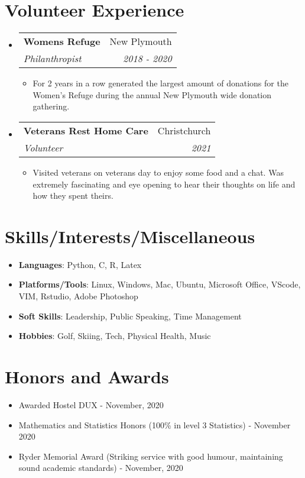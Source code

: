 \documentclass[a4paper,20pt]{article}
\makeatletter
\newcommand{\resumeItem}[2]{
  \item\small{
    \textbf{#1}{: #2 \vspace{-2pt}}
  }
}
\newcommand{\resumeSubheading}[4]{
  \vspace{-1pt}\item
    \begin{tabular*}{0.97\textwidth}{l@{\extracolsep{\fill}}r}
      \textbf{#1} & #2 \\
      \textit{#3} & \textit{#4} \\
    \end{tabular*}\vspace{-5pt}
}
\newcommand{\resumeSubItem}[2]{\resumeItem{#1}{#2}\vspace{-3pt}}
\newcommand{\resumeSubHeadingListStart}{\begin{itemize}[leftmargin=*]}
\newcommand{\resumeSubHeadingListEnd}{\end{itemize}}
\newcommand{\resumeItemListStart}{\begin{itemize}}
\newcommand{\resumeItemListEnd}{\end{itemize}\vspace{-5pt}}
\makeatother
\begin{document}
\section{Volunteer Experience}
  \resumeSubHeadingListStart
    \resumeSubheading{Womens Refuge}{New Plymouth}
    {Philanthropist}{2018 - 2020}
    \resumeItemListStart
        \item {For 2 years in a row generated the largest amount of donations for the Women's Refuge during the annual New Plymouth 
        wide donation gathering.}
      \resumeItemListEnd
\vspace{-1pt}
    \resumeSubheading
	{Veterans Rest Home Care}{Christchurch}
	{Volunteer}{2021}
		\resumeItemListStart
        \item {Visited veterans on veterans day to enjoy some food and a chat. Was extremely fascinating and eye opening to hear their 
        thoughts on life and how they spent theirs.}
      \resumeItemListEnd

\resumeSubHeadingListEnd


\vspace{-5pt}
\section{Skills/Interests/Miscellaneous}
\resumeSubHeadingListStart
	\resumeSubItem{Languages}{Python, C, R, Latex}
	\resumeSubItem{Platforms/Tools}{Linux, Windows, Mac, Ubuntu, Microsoft Office, VScode, VIM, Rstudio, Adobe Photoshop}
	\resumeSubItem{Soft Skills}{Leadership, Public Speaking, Time Management}
    \resumeSubItem{Hobbies}{Golf, Skiing, Tech, Physical Health, Music}
\resumeSubHeadingListEnd


\vspace{-2pt}
\section{Honors and Awards}
\resumeSubHeadingListStart
    \item {Awarded Hostel DUX - November, 2020}
    \vspace{-5pt}
    \item {Mathematics and Statistics Honors (100\% in level 3 Statistics) - November 2020}
    \vspace{-5pt}
    \item {Ryder Memorial Award (Striking service with good humour, maintaining sound academic standards) - November, 2020}
\resumeSubHeadingListEnd
\end{document}

